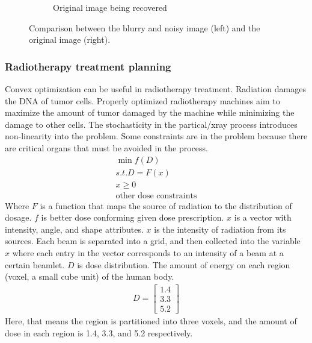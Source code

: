 \begin{figure}[htbp]
\begin{subfigure}[b]{0.49\textwidth}
    \caption{Original image being recovered}
    \label{fig:background_original}
  \end{subfigure}
  \caption{Comparison between the blurry and noisy image (left) and the original image (right).}
  \label{fig:comparison_images}
\end{figure}


\subsubsection{Radiotherapy treatment planning}
Convex optimization can be useful in radiotherapy treatment. Radiation damages the DNA of tumor cells. Properly optimized radiotherapy machines aim to maximize the amount of tumor damaged by the machine while minimizing the damage to other cells. The stochasticity in the partical/xray process introduces non-linearity into the problem. Some constraints are in the problem because there are critical organs that must be avoided in the process. 
\begin{equation}
  \begin{aligned}
    \min f(D) \\
    s.t. D = F(x) \\
    x \geq 0 \\
    \text{other dose constraints}
  \end{aligned}
\end{equation}
Where $F$ is a function that maps the source of radiation to the distribution of dosage. $f$ is better dose conforming given dose prescription. $x$ is a vector with intensity, angle, and shape attributes. $x$ is the intensity of radiation from its sources. Each beam is separated into a grid, and then collected into the variable $x$ where each entry in the vector corresponds to an intensity of a beam at a certain beamlet. $D$ is dose distribution. The amount of energy on each region (voxel, a small cube unit) of the human body. 
\begin{align}
  D = 
  \begin{bmatrix}
     1.4 \\
     3.3 \\
     5.2
  \end{bmatrix}
\end{align} 
Here, that means the region is partitioned into three voxels, and the amount of dose in each region is 1.4, 3.3, and 5.2 respectively.

